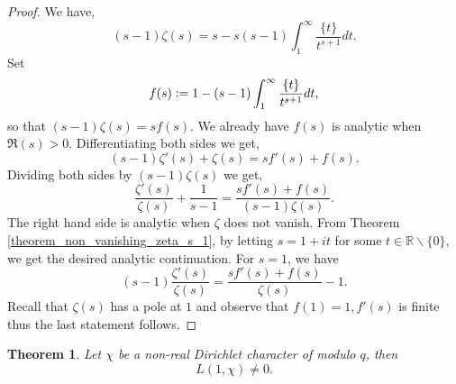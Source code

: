 \documentclass{article}
\newtheorem{theorem}{Theorem} [section]
\newcommand{\defeq}{\vcentcolon=}
\newcommand{\R}[0]{\mathbb{R}}
\begin{document}
\begin{proof}
  We have,
  \begin{equation*}
    (s-1)\zeta(s) = s -s(s-1)\int_1^\infty {\frac {\{t\}} {t^{s+1}}}dt.
  \end{equation*}
  Set 
  \begin{equation*}
    f(s)\defeq 1 - (s-1)\int_1^\infty {\frac {\{t\}} {t^{s+1}}}dt,
  \end{equation*}
  so that $(s-1)\zeta(s) = sf(s)$. We already have $f(s)$ is analytic when $\Re(s)>0$. Differentiating both sides we get,
  \begin{equation*}
    (s-1)\zeta'(s)+\zeta(s) = sf'(s)+f(s).
  \end{equation*}
  Dividing both sides by $(s-1)\zeta(s)$ we get,
  \begin{equation*}
    {\frac {\zeta'(s)} {\zeta(s)}} + {\frac 1 {s-1}} = {\frac {sf'(s)+f(s)} {(s-1)\zeta(s)}}.
  \end{equation*}
  The right hand side is analytic when $\zeta$ does not vanish. From Theorem \ref{theorem_non_vanishing_zeta_s_1}, by letting $s=1+it$ for some $t\in\R\backslash\{0\}$, we get the desired analytic continuation. For $s=1$, we have 
  \begin{equation*}
     (s-1){\frac {\zeta'(s)} {\zeta(s)}} = {\frac {sf'(s)+f(s)} {\zeta(s)}}-1.
  \end{equation*}
  Recall that $\zeta(s)$ has a pole at $1$ and observe that $f(1) = 1, f'(s)$ is finite thus the last statement follows.
\end{proof}
\begin{theorem}
  Let $\chi$ be a non-real Dirichlet character of modulo $q$, then 
  \begin{equation*}
    L(1,\chi)\not=0.
  \end{equation*}
  \label{theorem_L_chi_non_vanishing}
\end{theorem}
\end{document}
